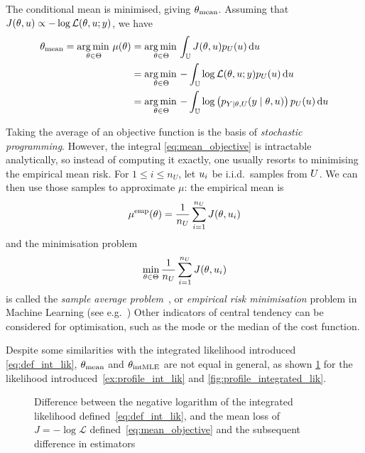 \documentclass[../../Main_ManuscritThese.tex]{subfiles}
\newcommand\imgpath{/home/victor/acadwriting/Manuscrit/Text/Chapter3/img/}
\begin{document}
The conditional mean is minimised, giving
${\theta}_{\mathrm{mean}}$. Assuming that
$J(\theta, u) \propto - \log \mathcal{L}(\theta,u;y)$, we have
\begin{align}
  {\theta}_{\mathrm{mean}} = \operatorname*{arg\,min \,}_{\theta\in\Theta} \mu(\theta)&= \operatorname*{arg\,min \,}_{\theta\in\Theta}\int_{\mathbb{U}} J(\theta,u) p_{U}(u)\,\mathrm{d}u \\
                                                            &= \operatorname*{arg\,min \,}_{\theta\in\Theta} - \int_{\mathbb{U}} \log \mathcal{L}(\theta,u;y) p_{U}(u)\,\mathrm{d}u \\
                                                            &= \operatorname*{arg\,min \,}_{\theta\in\Theta} - \int_{\mathbb{U}}\log\left(p_{Y \mid \theta,U}(y \mid \theta,u)\right)p_{U}(u)\,\mathrm{d}u 
\end{align}

Taking the average of an objective function is the basis of
\emph{stochastic programming}.  However, the integral
\cref{eq:mean_objective} is intractable analytically, so instead of
computing it exactly, one usually resorts to minimising the empirical
mean risk. For $1\leq i \leq n_U$, let $u_i$ be i.i.d.\ samples from
$U$. We can then use those samples to approximate $\mu$: the
empirical mean is
\begin{equation}
  \label{eq:emp_mean_objective}
  \mu^{\mathrm{emp}}(\theta) = \frac{1}{n_U}\sum_{i=1}^{n_U} J(\theta, u_i)
\end{equation}
and the minimisation problem
\begin{equation}
  \min_{\theta\in\Theta} \frac{1}{n_U}\sum_{i=1}^{n_U} J(\theta, u_i)
\end{equation}
is called the \emph{sample average
  problem}~\citep{juditsky_stochastic_2009}, or \emph{empirical risk
  minimisation} problem in Machine Learning (see
e.g.~\cite{vapnik_principles_1992}) Other indicators of central
tendency can be considered for optimisation, such as the mode or the
median of the cost function.

Despite some similarities with the integrated likelihood introduced
\cref{eq:def_int_lik}, ${\theta}_{\mathrm{mean}}$ and
${\theta}_{\mathrm{intMLE}}$ are not equal in general, as shown
\cref{fig:difference_arithmetic_geometric_mean} for the likelihood
introduced~\cref{ex:profile_int_lik} and
\cref{fig:profile_integrated_lik}.

\begin{figure}[ht]
  \centering
  
  \caption[Difference between integrated likelihood and mean loss]{\label{fig:difference_arithmetic_geometric_mean} Difference between the negative logarithm of the integrated likelihood defined~\cref{eq:def_int_lik}, and the mean loss of $J = -\log \mathcal{L}$ defined~\cref{eq:mean_objective} and the subsequent difference in estimators}
\end{figure}
\end{document}
